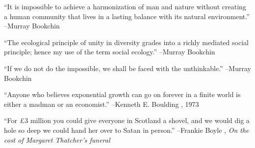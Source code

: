 \documentclass{article}%
\begin{document}
\linebreak%
\vspace{1mm}%
\begin{minipage}{\textwidth}%
\flushleft%
“It is impossible to achieve a harmonization of man and nature without creating a human community that lives in a lasting balance with its natural environment.”%
\linebreak%
\vspace{1mm}%
–Murray Bookchin%
\linebreak%
\vspace{1mm}%
\end{minipage}%
\linebreak%
\vspace{1mm}%
\begin{minipage}{\textwidth}%
\flushleft%
“The ecological principle of unity in diversity grades into a richly mediated social principle; hence my use of the term social ecology.”%
\linebreak%
\vspace{1mm}%
–Murray Bookchin%
\linebreak%
\vspace{1mm}%
\end{minipage}%
\linebreak%
\vspace{1mm}%
\begin{minipage}{\textwidth}%
\flushleft%
“If we do not do the impossible, we shall be faced with the unthinkable.”%
\linebreak%
\vspace{1mm}%
–Murray Bookchin%
\linebreak%
\vspace{1mm}%
\end{minipage}%
\linebreak%
\vspace{1mm}%
\begin{minipage}{\textwidth}%
\flushleft%
“Anyone who believes exponential growth can go on forever in a finite world is either a madman or an economist.”%
\linebreak%
\vspace{1mm}%
–Kenneth E. Boulding%
, 1973%
\linebreak%
\vspace{1mm}%
\end{minipage}%
\linebreak%
\vspace{1mm}%
\begin{minipage}{\textwidth}%
\flushleft%
“For £3 million you could give everyone in Scotland a shovel, and we would dig a hole so deep we could hand her over to Satan in person.”%
\linebreak%
\vspace{1mm}%
–Frankie Boyle%
, \textit{On the cost of Margaret Thatcher's funeral}%
\linebreak%
\vspace{1mm}%
\end{minipage}%
\end{document}
